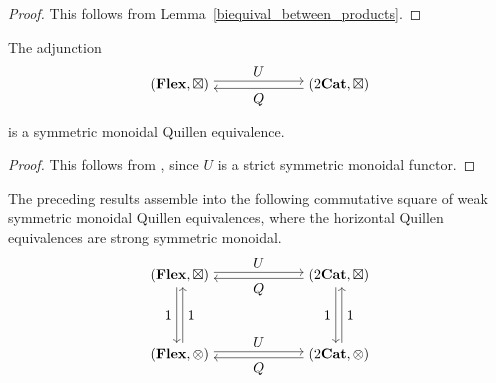 \documentclass{tac}
\begin{document}
\begin{proof}\label{adj_is_Quill_equiv}
This follows from Lemma~\ref{biequival_between_products}.
\end{proof}

\begin{theorem}
The adjunction
\[
\begin{tikzpicture}[node distance=4cm]
\node (A) {$(\mathbf{Flex},\boxtimes)$};
\node (B) [right of=A] {$(2\mathbf{Cat},\boxtimes)$};

\draw[transform canvas={yshift=0.6ex},->] (A) -- node[above] {$U$} (B);
\draw[transform canvas={yshift=-0.6ex},<-] (A) -- node[below] {$Q$} (B);
\end{tikzpicture}
\]
is a symmetric monoidal Quillen equivalence.
\end{theorem}

\begin{proof}
This follows from \cite[Theorem~4.10]{Campbell2026}, since $U$ is a
strict symmetric monoidal functor.
\end{proof}

The preceding results assemble into the following commutative square of weak
symmetric monoidal Quillen equivalences, where the horizontal Quillen equivalences are strong symmetric monoidal.
\[
\begin{tikzpicture}[node distance=3cm]
\node (A) at (0,2) {$(\mathbf{Flex},\boxtimes)$};
\node (B) at (4,2) {$(2\mathbf{Cat},\boxtimes)$};
\node (C) at (0,0) {$(\mathbf{Flex},\otimes)$};
\node (D) at (4,0) {$(2\mathbf{Cat},\otimes)$};

\draw[transform canvas={yshift=0.5ex},->] (A) -- node[above] {$U$} (B);
\draw[transform canvas={yshift=-0.5ex},<-] (A) -- node[below] {$Q$} (B);

\draw[transform canvas={xshift=-0.5ex},->] (A) -- node[left] {$1$} (C);
\draw[transform canvas={xshift=0.5ex},<-] (A) -- node[right] {$1$} (C);

\draw[transform canvas={xshift=-0.5ex},->] (B) -- node[left] {$1$} (D);
\draw[transform canvas={xshift=0.5ex},<-] (B) -- node[right] {$1$} (D);

\draw[transform canvas={yshift=0.5ex},->] (C) -- node[above] {$U$} (D);
\draw[transform canvas={yshift=-0.5ex},<-] (C) -- node[below] {$Q$} (D);
\end{tikzpicture}
\]
\end{document}
